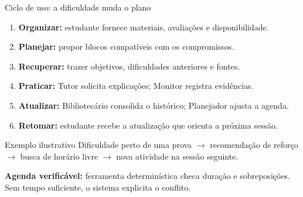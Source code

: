\documentclass[aspectratio=169,11pt]{beamer}
\begin{document}
\begin{frame}{Ciclo de uso: a dificuldade muda o plano}
  \begin{enumerate}
    \item \textbf{Organizar:} estudante fornece materiais, avaliações e disponibilidade.
    \item \textbf{Planejar:} propor blocos compatíveis com os compromissos.
    \item \textbf{Recuperar:} trazer objetivos, dificuldades anteriores e fontes.
    \item \textbf{Praticar:} Tutor solicita explicações; Monitor registra evidências.
    \item \textbf{Atualizar:} Bibliotecário consolida o histórico; Planejador ajusta a agenda.
    \item \textbf{Retomar:} estudante recebe a atualização que orienta a próxima sessão.
  \end{enumerate}
  \vspace{2mm}
  \begin{block}{Exemplo ilustrativo}
    Dificuldade perto de uma prova $\rightarrow$ recomendação de reforço
    $\rightarrow$ busca de horário livre $\rightarrow$ nova atividade na sessão seguinte.
  \end{block}
  \small\textbf{Agenda verificável:} ferramenta determinística checa duração e
  sobreposições. Sem tempo suficiente, o sistema explicita o conflito.
\end{frame}
\end{document}

